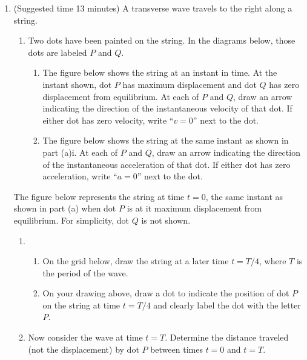 \documentclass{../../../oss-classkick}
\begin{document}
\begin{enumerate}
\item (Suggested time 13 minutes) A transverse wave travels to the right
  along a string.
  \begin{enumerate}
  \item  Two dots have been painted on the string. In the diagrams below, those
    dots are labeled $P$ and $Q$.
    \begin{enumerate}
    \item The figure below shows the string at an instant in time. At the
      instant shown, dot $P$ has maximum displacement and dot $Q$ has zero
      displacement from equilibrium. At each of $P$ and $Q$, draw an
      arrow indicating the direction of the instantaneous velocity of that dot.
      If either dot has zero velocity, write ``$v=0$'' next to the dot.
      
    \item The figure below shows the string at the same instant as shown in
      part (a)i. At each of $P$ and $Q$, draw an arrow indicating the
      direction of the instantaneous acceleration of that dot. If either dot
      has zero acceleration, write ``$a=0$'' next to the dot.
    \end{enumerate}
  \end{enumerate}
  The figure below represents the string at time $t=0$, the same instant as
  shown in part (a) when dot $P$ is at it maximum displacement from
  equilibrium. For simplicity, dot $Q$ is not shown.
  \begin{enumerate}[resume]
  \item 
    \begin{enumerate}
    \item On the grid below, draw the string at a later time $t=T/4$, where
      $T$ is the period of the wave.
      
    \item On your drawing above, draw a dot to indicate the position of dot
      $P$ on the string at time $t=T/4$ and clearly label the dot with the
      letter $P$.
    \end{enumerate}
    
  \item Now consider the wave at time $t=T$. Determine the distance traveled
    (not the displacement) by dot $P$ between times $t=0$ and $t=T$.
    \vspace{1in}
  \end{enumerate}
  \newpage
  

\end{enumerate}
\end{document}
